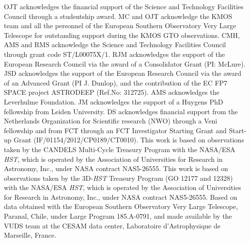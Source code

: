 \documentclass[fleqn,usenatbib]{mnras}
\begin{document}
OJT acknowledges the financial support of the Science and Technology Facilities Council through a studentship award. 
MC and OJT acknowledge the KMOS team and all the personnel of the European Southern Observatory Very Large Telescope for outstanding support during the KMOS GTO observations.
CMH, AMS and RMS acknowledge the Science and Technology Facilities Council through grant code ST/L00075X/1.
RJM acknowledges the support of the European Research Council via the award of a Consolidator Grant (PI: McLure).
JSD acknowledges the support of the European Research Council via the award of an Advanced Grant (PI J. Dunlop), and the contribution of the EC FP7 SPACE project ASTRODEEP (Ref.No: 312725).
AMS acknowledges the Leverhulme Foundation.
JM acknowledges the support of a Huygens PhD fellowship from Leiden University. DS acknowledges financial support from the Netherlands Organization for Scientific research (NWO) through a Veni fellowship and from FCT through an FCT Investigator Starting Grant and Start-up Grant (IF/01154/2012/CP0189/CT0010).
This work is based on observations taken by the CANDELS Multi-Cycle Treasury Program with the NASA/ESA {\em HST}, which is operated by the Association of Universities for Research in Astronomy, Inc., under NASA contract NAS5-26555.
This work is based on observations taken by the 3D-{\em HST} Treasury Program (GO 12177 and 12328) with the NASA/ESA {\em HST}, which is operated by the Association of Universities for Research in Astronomy, Inc., under NASA contract NAS5-26555.
Based on data obtained with the European Southern Observatory Very Large Telescope, Paranal, Chile, under Large Program 185.A-0791, and made available by the VUDS team at the CESAM data center, Laboratoire d'Astrophysique de Marseille, France.


\clearpage 

%




\appendix

\bsp    %
\label{lastpage}
\end{document}
